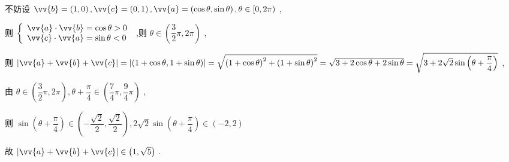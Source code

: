 \begin{enumerate}
\begin{jieda}
        不妨设 $\vv{b} = \left( {1,0}\right) ,\vv{c} = \left( {0,1}\right) ,\vv{a} = \left( {\cos \theta ,\sin \theta }\right) ,\theta  \in  \lbrack 0,{2\pi })$ ,
        
        则 $\left\{  \begin{array}{l} \vv{a} \cdot  \vv{b} = \cos \theta  > 0 \\  \vv{c} \cdot  \vv{a} = \sin \theta  < 0 \end{array}\right.$ ,则 $\theta  \in  \left( {\dfrac{3}{2}\pi ,{2\pi }}\right)$ ,
        
        则 $\left| {\vv{a} + \vv{b} + \vv{c}}\right|  = \left| \left( {1 + \cos \theta ,1 + \sin \theta }\right) \right|  = \sqrt{{\left( 1 + \cos \theta \right) }^{2} + {\left( 1 + \sin \theta \right) }^{2}} = \sqrt{3 + 2\cos \theta  + 2\sin \theta }  = \sqrt{3 + 2\sqrt{2}\sin \left( {\theta  + \dfrac{\pi }{4}}\right) }$ ,
        
        由 $\theta  \in  \left( {\dfrac{3}{2}\pi ,{2\pi }}\right) ,\theta  + \dfrac{\pi }{4} \in  \left( {\dfrac{7}{4}\pi ,\dfrac{9}{4}\pi }\right)$ ,
        
        则 $\sin \left( {\theta  + \dfrac{\pi }{4}}\right)  \in  \left( {-\dfrac{\sqrt{2}}{2},\dfrac{\sqrt{2}}{2}}\right) ,2\sqrt{2}\sin \left( {\theta  + \dfrac{\pi }{4}}\right)  \in  \left( {-2,2}\right)$
        
        故 $\left| {\vv{a} + \vv{b} + \vv{c}}\right|  \in  \left( {1,\sqrt{5}}\right)$ .
    \end{jieda}
\end{enumerate}

